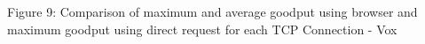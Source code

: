 \documentclass[12pt]{article}
\begin{document}
\vspace*{-3cm}
{
\begin{center}Figure 9: Comparison of maximum and average goodput using browser and maximum goodput using direct request for each TCP Connection - Vox\end{center}
}
\vspace*{-2cm}
\hspace*{-2cm}
\end{document}
